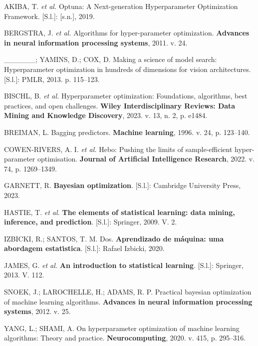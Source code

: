 \documentclass[
  12pt,
  letterpaper,
  DIV=11,
  numbers=noendperiod]{scrreprt}
\newlength{\cslhangindent}
\newenvironment{CSLReferences}[2] %
 {\begin{list}{}{%
  \setlength{\itemindent}{0pt}
  \setlength{\leftmargin}{0pt}
  \setlength{\parsep}{0pt}
  \ifodd #1
   \setlength{\leftmargin}{\cslhangindent}
   \setlength{\itemindent}{-1\cslhangindent}
  \fi
  \setlength{\itemsep}{#2\baselineskip}}}
 {\end{list}}
\begin{document}
\label{refs}
\begin{CSLReferences}{0}{1}
AKIBA, T. \emph{et al.} Optuna: A Next-generation Hyperparameter
Optimization Framework. {[}S.l.{]}: {[}s.n.{]}, 2019.

BERGSTRA, J. \emph{et al.} Algorithms for hyper-parameter optimization.
\textbf{Advances in neural information processing systems}, 2011. v. 24.

\_\_\_\_\_\_; YAMINS, D.; COX, D. Making a science of model search:
Hyperparameter optimization in hundreds of dimensions for vision
architectures. {[}S.l.{]}: PMLR, 2013. p. 115--123.

BISCHL, B. \emph{et al.} Hyperparameter optimization: Foundations,
algorithms, best practices, and open challenges. \textbf{Wiley
Interdisciplinary Reviews: Data Mining and Knowledge Discovery}, 2023.
v. 13, n. 2, p. e1484.

BREIMAN, L. Bagging predictors. \textbf{Machine learning}, 1996. v. 24,
p. 123--140.

COWEN-RIVERS, A. I. \emph{et al.} Hebo: Pushing the limits of
sample-efficient hyper-parameter optimisation. \textbf{Journal of
Artificial Intelligence Research}, 2022. v. 74, p. 1269--1349.

GARNETT, R. \textbf{Bayesian optimization}. {[}S.l.{]}: Cambridge
University Press, 2023.

HASTIE, T. \emph{et al.} \textbf{The elements of statistical learning:
data mining, inference, and prediction}. {[}S.l.{]}: Springer, 2009. V.
2.

IZBICKI, R.; SANTOS, T. M. Dos. \textbf{Aprendizado de m{á}quina: uma
abordagem estat{ı́}stica}. {[}S.l.{]}: Rafael Izbicki, 2020.

JAMES, G. \emph{et al.} \textbf{An introduction to statistical
learning}. {[}S.l.{]}: Springer, 2013. V. 112.

SNOEK, J.; LAROCHELLE, H.; ADAMS, R. P. Practical bayesian optimization
of machine learning algorithms. \textbf{Advances in neural information
processing systems}, 2012. v. 25.

YANG, L.; SHAMI, A. On hyperparameter optimization of machine learning
algorithms: Theory and practice. \textbf{Neurocomputing}, 2020. v. 415,
p. 295--316.

\end{CSLReferences}
\end{document}
